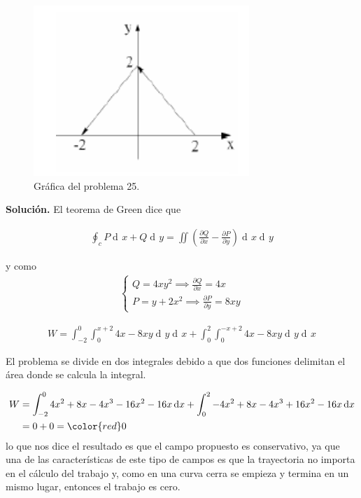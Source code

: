 \documentclass[12pt]{article}
\DeclareMathOperator{\di}{d\!}
\begin{document}
\begin{figure}[!htbp] 
	\label{ej25}
	\centering
	\includegraphics[scale = 1]{problema25.png}
	\caption{Gráfica del problema 25.}
\end{figure}

\vspace{5mm}

\noindent \textbf{Solución.}
\vspace{3mm}
El teorema de Green dice que 

\begin{align*}
	\oint_c P \di x + Q \di y = \iint \left( \frac{\partial Q}{\partial x} 
	- \frac{\partial P}{\partial y} \right) \di x \di y
\end{align*}

y como 
\begin{align*}
	\begin{cases}
		Q = 4xy^2 \implies 	\frac{\partial Q}{\partial x} = 4x \\ 
		P = y + 2x^2 \implies  \frac{\partial P}{\partial y} = 8xy	
	\end{cases}
\end{align*}

\begin{align*}
	W = \int_{-2}^{0} \int_0^{x+2} 4x -8xy \di y \di x 
	+ \int_0^2 \int_0^{-x+2} 4x-8xy \di y \di x
\end{align*}

El problema se divide en dos integrales debido a que dos funciones delimitan el área donde
se calcula la integral.

\begin{align*}
	W &= \int_{-2}^0 4x^2 + 8x - 4x^3 - 16x^2 -16x \di x + \int_0^2 -4x^2 + 8x -4 x^3 + 16x^2
	- 16x \di x \\
	& = 0 + 0 = \color{red} 0
\end{align*}
lo que nos dice el resultado es que el campo propuesto es conservativo, ya que una de las 
características de este tipo de campos es que la trayectoria no importa en el cálculo del
trabajo y, como en una curva cerra se empieza y termina en un mismo lugar, entonces
el trabajo es cero.
\end{document}
